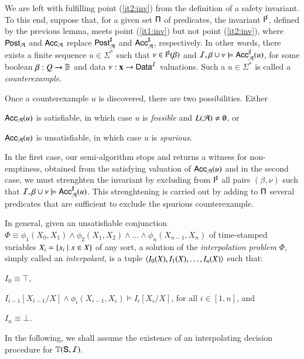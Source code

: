 \documentclass[10pt,conference,letterpaper,twocolumn]{IEEEtran}
\begin{document}
We are left with fulfilling point (\ref{it2:inv}) from the definition
of a safety invariant. To this end, suppose that, for a given set
$\mathsf{\Pi}$ of predicates, the invariant ${\mathsf{I}}^\sharp$, defined by the
previous lemma, meets point (\ref{it1:inv}) but not point
(\ref{it2:inv}), where $\mathsf{Post}_{\mathcal{A}}$ and $\mathsf{Acc}_{\mathcal{A}}$ replace
${\mathsf{Post}}^\sharp_{\mathcal{A}}$ and ${\mathsf{Acc}}^\sharp_{\mathcal{A}}$, respectively. In other words,
there exists a finite sequence $u \in \Sigma^*$ such that $\nu \in
{\mathsf{I}}^\sharp(\beta)$ and $\mathcal{I},\beta\cup\nu \models {\mathsf{Acc}}^\sharp_{\mathcal{A}}(u)$,
for some boolean $\beta : Q \rightarrow \mathbb{B}$ and data $\nu :
\mathbf x \rightarrow \mathsf{Data}^{\mathcal{I}}$ valuations. Such a $u\in\Sigma^*$ is
called a \emph{counterexample}.

Once a counterexample $u$ is discovered, there are two
possibilities. Either\begin{inparaenum}[(i)]
\item $\mathsf{Acc}_{\mathcal{A}}(u)$ is satisfiable, in which case $u$ is
  \emph{feasible} and $L(\mathcal{A}) \neq \emptyset$, or
%
\item $\mathsf{Acc}_{\mathcal{A}}(u)$ is unsatisfiable, in which case $u$ is
  \emph{spurious}.
\end{inparaenum}
In the first case, our semi-algorithm stops and returns a witness for
non-emptiness, obtained from the satisfying valuation of
$\mathsf{Acc}_{\mathcal{A}}(u)$ and in the second case, we must strenghten the
invariant by excluding from ${\mathsf{I}}^\sharp$ all pairs $(\beta,\nu)$ such
that $\mathcal{I},\beta\cup\nu \models {\mathsf{Acc}}^\sharp_{\mathcal{A}}(u)$. This strenghtening
is carried out by adding to $\mathsf{\Pi}$ several predicates that are
sufficient to exclude the spurious counterexample.

In general, given an unsatisfiable conjunction $\Phi \equiv
\phi_1(X_0,X_1) \wedge \phi_2(X_1,X_2) \wedge \ldots \wedge
\phi_n(X_{n-1},X_n)$ of time-stamped variables $X_i = \left\{ x_i \mid x
  \in X \right\}$ of any sort, a solution of the \emph{interpolation problem}
$\Phi$, simply called an \emph{interpolant}, is a tuple $\left\langle I_0(X),
  I_1(X), \ldots, I_n(X) \right\rangle$ such that:\begin{inparaenum}[(i)]
\item $I_0 \equiv \top$,  
%
\item $I_{i-1}[X_{i-1}/X] \wedge \phi_i(X_{i-1},X_i) \models
  I_i[X_i/X]$, for all $i \in [1,n]$, and
%
\item $I_n \equiv \bot$. 
\end{inparaenum}
In the following, we shall assume the existence of an interpolating
decision procedure for $\mathbb{T}(\mathsf{S},\mathcal{I})$.
\end{document}
